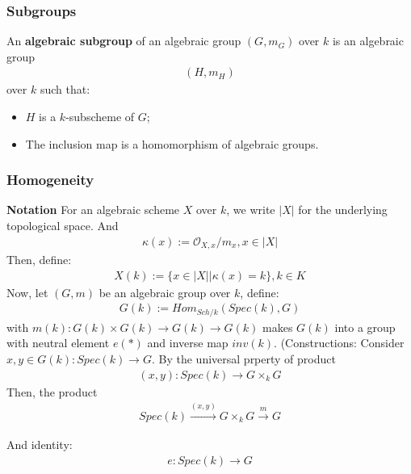 \documentclass[Total.tex]{subfiles}
\begin{document}
\begin{example}
			\subsubsection{Subgroups}
				\begin{Def}
					An \textbf{algebraic subgroup} of an algebraic group $(G,m_G)$ over $k$ is an algebraic group 
					\begin{gather*}
						(H,m_H)
					\end{gather*}
					over $k$ such that:
					\begin{itemize}
						\item $H$ is a $k$-subscheme of $G$;
						\item The inclusion map is a homomorphism of algebraic groups.
					\end{itemize}
				\end{Def}
			\subsubsection{Homogeneity}
				\textbf{Notation} For an algebraic scheme $X$ over $k$, we write $|X|$ for the underlying topological space. And
				\begin{gather*}
					\kappa(x):=\mathcal{O}_{X,x}/m_x,x\in |X|
				\end{gather*}
				Then, define:
				\begin{gather*}
					X(k):=\{x\in |X||\kappa(x)=k\},k\in K
				\end{gather*}
				Now, let $(G,m)$ be an algebraic group over $k$, define:
				\begin{gather*}
					G(k):=Hom_{Sch/k} (Spec(k),G)
				\end{gather*}
				 with $m(k):G(k)\times G(k)\rightarrow G(k)\rightarrow G(k)$ makes $G(k)$ into a group with neutral element $e(*)$ and inverse map $inv(k)$.
				 (Constructions: Consider $x,y\in G(k):Spec(k)\rightarrow G$. By the universal prperty of product
				 \begin{gather*}
				 	(x,y):Spec(k)\rightarrow G\times_k G
				 \end{gather*}
				 Then, the product
				 \begin{gather*}
				 	Spec(k)\stackrel{(x,y)}{\rightarrow} G\times_k G\stackrel{m}{\rightarrow} G
				 \end{gather*}
				 
				 And identity: 
				 \begin{gather*}
				 	e:Spec(k)\rightarrow G
				 \end{gather*}
				 

\end{example}
\end{document}
